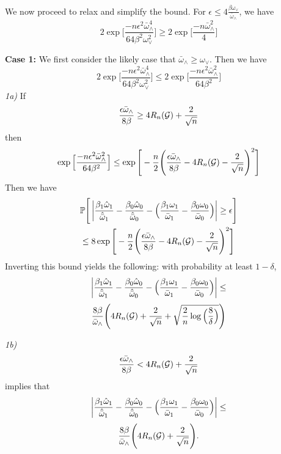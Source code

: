 \documentclass{article}
\begin{document}
We now proceed to relax and simplify the bound.
For $\epsilon \leq 4 \frac{\beta \omega_{\vee} }{\bar{\omega}_{\wedge}}$, we have
\begin{equation*}
     2\exp \Big[\frac{-n \epsilon^2 \bar{\omega}_{\wedge}^4}{64\beta^2\omega_{\vee}^2} \Big] \geq 2\exp\Big[\frac{-n\bar{\omega}_{\wedge}^2}{4} \Big]
\end{equation*}

\textbf{Case 1: }
We first consider the likely case that $\bar{\omega}_{\wedge} \geq \omega_{\vee}$. Then we have
\begin{equation*}
     2\exp \Big[\frac{-n \epsilon^2 \bar{\omega}_{\wedge}^4}{64\beta^2\omega_{\vee}^2} \Big] \leq 2\exp \Big[\frac{-n \epsilon^2 \bar{\omega}_{\wedge}^2}{64\beta^2} \Big] 
\end{equation*}
\emph{1a)} If 
\begin{equation}
    \frac{\epsilon \bar{\omega}_{\wedge}}{8\beta} \geq 4R_n(\mathcal{G}) + \frac{2}{\sqrt{n}}
\end{equation} then 
\begin{equation*}
     \exp \Big[\frac{-n \epsilon^2 \bar{\omega}_{\wedge}^2}{64\beta^2} \Big] \leq \exp\Bigg[-\frac{n}{2}\Bigg(\frac{\epsilon \bar{\omega}_{\wedge}}{8\beta}  - 4 R_n(\mathcal{G}) - \frac{2}{\sqrt{n}}\Bigg)^2 \Bigg] 
\end{equation*}
Then we have
\begin{eqnarray}
&\mathbb{P}\Bigg[  \left| \frac{\beta_1 \hat{\omega}_1 }{\hat{\bar{\omega}}_1} - \frac{\beta_0 \hat{\omega}_0}{\hat{\bar{\omega}}_0} -  \Big(\frac{\beta_1 \omega_1}{\bar{\omega}_1} - \frac{\beta_0 \omega_0}{\bar{\omega}_0} \Big) \right| \geq \epsilon \Bigg] \\
& \leq 8\exp\Bigg[-\frac{n}{2}\Bigg(\frac{\epsilon \bar{\omega}_{\wedge}}{8\beta}  - 4 R_n(\mathcal{G}) - \frac{2}{\sqrt{n}}\Bigg)^2 \Bigg] 
\end{eqnarray}
Inverting this bound yields the following: with probability at least $1- \delta$, 
\[
\left| \frac{\beta_1 \hat{\omega}_1 }{\hat{\bar{\omega}}_1} - \frac{\beta_0 \hat{\omega}_0}{\hat{\bar{\omega}}_0} -  \Big(\frac{\beta_1 \omega_1}{\bar{\omega}_1} - \frac{\beta_0 \omega_0}{\bar{\omega}_0} \Big) \right| \leq
\]
\[
\frac{8\beta}{\bar{\omega}_{\wedge}}\Bigg( 4 R_n(\mathcal{G}) + \frac{2}{\sqrt{n}} +\sqrt{\frac{2}{n}\log\Big(\frac{8}{\delta}\Big)}  \Bigg)
\]

\emph{1b)}
\begin{equation}
    \frac{\epsilon \bar{\omega}_{\wedge}}{8\beta} < 4R_n(\mathcal{G}) + \frac{2}{\sqrt{n}}
\end{equation} implies that 
\[
\left| \frac{\beta_1 \hat{\omega}_1 }{\hat{\bar{\omega}}_1} - \frac{\beta_0 \hat{\omega}_0}{\hat{\bar{\omega}}_0} -  \Big(\frac{\beta_1 \omega_1}{\bar{\omega}_1} - \frac{\beta_0 \omega_0}{\bar{\omega}_0} \Big) \right| \leq
\]
\[
\frac{8\beta}{\bar{\omega}_{\wedge}}\Bigg( 4 R_n(\mathcal{G}) + \frac{2}{\sqrt{n}} \Bigg).
\]
\end{document}
